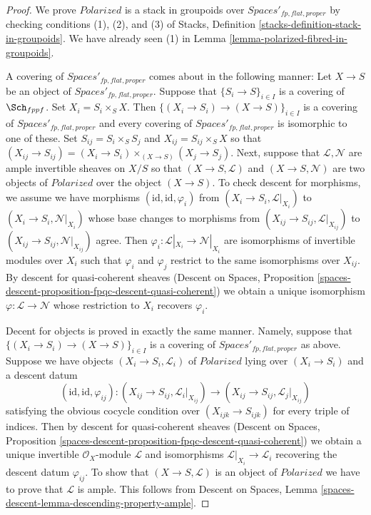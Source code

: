 \begin{proof}
We prove $\textit{Polarized}$ is a stack in groupoids over
$\textit{Spaces}'_{fp, flat, proper}$
by checking conditions (1), (2), and (3)
of Stacks, Definition \ref{stacks-definition-stack-in-groupoids}.
We have already seen (1) in
Lemma \ref{lemma-polarized-fibred-in-groupoids}.

\medskip\noindent
A covering of $\textit{Spaces}'_{fp, flat, proper}$ comes about
in the following manner: Let $X \to S$ be an object of
$\textit{Spaces}'_{fp, flat, proper}$. Suppose that
$\{S_i \to S\}_{i \in I}$ is a covering of $\Sch_{fppf}$.
Set $X_i = S_i \times_S X$. Then $\{(X_i \to S_i) \to (X \to S)\}_{i \in I}$
is a covering of $\textit{Spaces}'_{fp, flat, proper}$ and
every covering of $\textit{Spaces}'_{fp, flat, proper}$ is isomorphic
to one of these. Set $S_{ij} = S_i \times_S S_j$ and
$X_{ij} = S_{ij} \times_S X$ so that $(X_{ij} \to S_{ij}) =
(X_i \to S_i) \times_{(X \to S)} (X_j \to S_j)$.
Next, suppose that $\mathcal{L}, \mathcal{N}$
are ample invertible sheaves on $X/S$ so that
$(X \to S, \mathcal{L})$ and $(X \to S, \mathcal{N})$
are two objects of $\textit{Polarized}$ over the object $(X \to S)$.
To check descent for morphisms, we assume we have morphisms
$(\text{id}, \text{id}, \varphi_i)$ from
$(X_i \to S_i, \mathcal{L}|_{X_i})$ to
$(X_i \to S_i, \mathcal{N}|_{X_i})$
whose base changes to morphisms from
$(X_{ij} \to S_{ij}, \mathcal{L}|_{X_{ij}})$ to
$(X_{ij} \to S_{ij}, \mathcal{N}|_{X_{ij}})$
agree. Then
$\varphi_i : \mathcal{L}|_{X_i} \to \mathcal{N}|_{X_i}$
are isomorphisms of invertible modules over $X_i$ such that
$\varphi_i$ and $\varphi_j$ restrict to the same
isomorphisms over $X_{ij}$.
By descent for quasi-coherent sheaves
(Descent on Spaces, Proposition
\ref{spaces-descent-proposition-fpqc-descent-quasi-coherent})
we obtain a unique isomorphism $\varphi : \mathcal{L} \to \mathcal{N}$
whose restriction to $X_i$ recovers $\varphi_i$.

\medskip\noindent
Decent for objects is proved in exactly the same manner.
Namely, suppose that
$\{(X_i \to S_i) \to (X \to S)\}_{i \in I}$
is a covering of $\textit{Spaces}'_{fp, flat, proper}$
as above.
Suppose we have objects $(X_i \to S_i, \mathcal{L}_i)$
of $\textit{Polarized}$ lying over $(X_i \to S_i)$
and a descent datum
$$
(\text{id}, \text{id}, \varphi_{ij}) :
(X_{ij} \to S_{ij}, \mathcal{L}_i|_{X_{ij}})
\to
(X_{ij} \to S_{ij}, \mathcal{L}_j|_{X_{ij}})
$$
satisfying the obvious cocycle condition over
$(X_{ijk} \to S_{ijk})$ for every triple of indices.
Then by
 descent for quasi-coherent sheaves
(Descent on Spaces, Proposition
\ref{spaces-descent-proposition-fpqc-descent-quasi-coherent})
we obtain a unique invertible $\mathcal{O}_X$-module
$\mathcal{L}$ and isomorphisms $\mathcal{L}|_{X_i} \to \mathcal{L}_i$
recovering the descent datum $\varphi_{ij}$.
To show that
$(X \to S, \mathcal{L})$ is an object of
$\textit{Polarized}$ we have to prove that
$\mathcal{L}$ is ample. This follows from
Descent on Spaces, Lemma \ref{spaces-descent-lemma-descending-property-ample}.


\end{proof}
